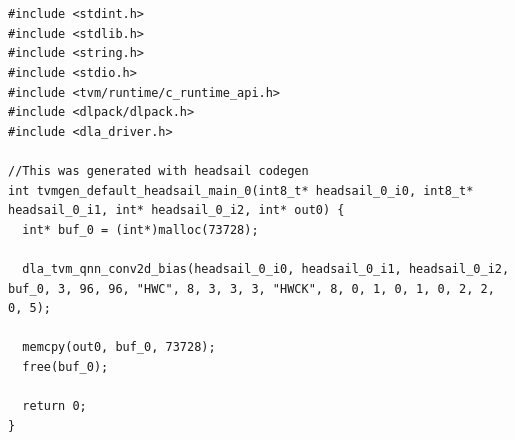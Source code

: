 \documentclass[12pt,a4paper,english
]{tunithesis}
\begin{document}
\chapter*{\appA}                       %
\markboth{\appA}{\appA}                %
\label{app:dla-codegen}


\begin{lstlisting}[style=customc, basicstyle=\footnotesize, caption={Code generated by BYOC backend for Headsail DLA to execute Conv2D with bias pattern.}]
#include <stdint.h>
#include <stdlib.h>
#include <string.h>
#include <stdio.h>
#include <tvm/runtime/c_runtime_api.h>
#include <dlpack/dlpack.h>
#include <dla_driver.h>

//This was generated with headsail codegen
int tvmgen_default_headsail_main_0(int8_t* headsail_0_i0, int8_t* headsail_0_i1, int* headsail_0_i2, int* out0) {
  int* buf_0 = (int*)malloc(73728);

  dla_tvm_qnn_conv2d_bias(headsail_0_i0, headsail_0_i1, headsail_0_i2, buf_0, 3, 96, 96, "HWC", 8, 3, 3, 3, "HWCK", 8, 0, 1, 0, 1, 0, 2, 2, 0, 5);

  memcpy(out0, buf_0, 73728);
  free(buf_0);

  return 0;
}
\end{lstlisting}



\end{document}
